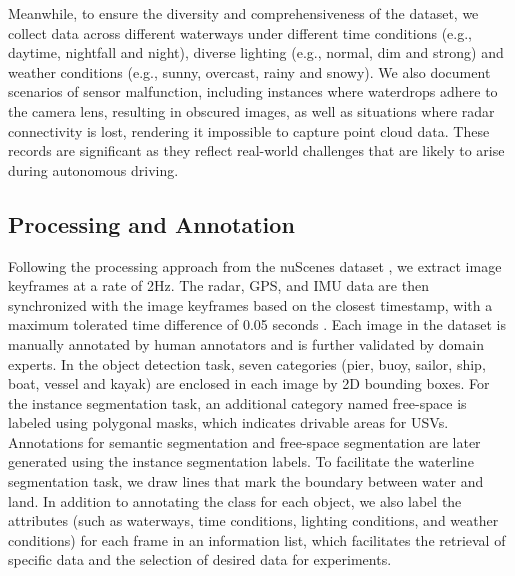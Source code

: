 \documentclass[lettersize,journal]{IEEEtran}
\begin{document}
Meanwhile, to ensure the diversity and comprehensiveness of the dataset, we collect data across different waterways under different time conditions (e.g., daytime, nightfall and night), diverse lighting (e.g., normal, dim and strong) and weather conditions (e.g., sunny, overcast, rainy and snowy).
We also document scenarios of sensor malfunction, including instances where waterdrops adhere to the camera lens, resulting in obscured images, as well as situations where radar connectivity is lost, rendering it impossible to capture point cloud data. These records are significant as they reflect real-world challenges that are likely to arise during autonomous driving.

\subsection{Processing and Annotation}
Following the processing approach from the nuScenes dataset \cite{caesar2020nuscenes}, we extract image keyframes at a rate of 2Hz. The radar, GPS, and IMU data are then synchronized with the image keyframes based on the closest timestamp, with a maximum tolerated time difference of 0.05 seconds \cite{palffy2022multi}.
Each image in the dataset is manually annotated by human annotators and is further validated by domain experts. 
In the object detection task, seven categories (pier, buoy, sailor, ship, boat, vessel and kayak) are enclosed in each image by 2D bounding boxes. 
For the instance segmentation task, an additional category named free-space is labeled using polygonal masks, which indicates drivable areas for USVs.
Annotations for semantic segmentation and free-space segmentation are later generated using the instance segmentation labels. 
To facilitate the waterline segmentation task, we draw lines that mark the boundary between water and land.
In addition to annotating the class for each object, we also label the attributes (such as waterways, time conditions, lighting conditions, and weather conditions) for each frame in an information list, which facilitates the retrieval of specific data and the selection of desired data for experiments.
\end{document}
